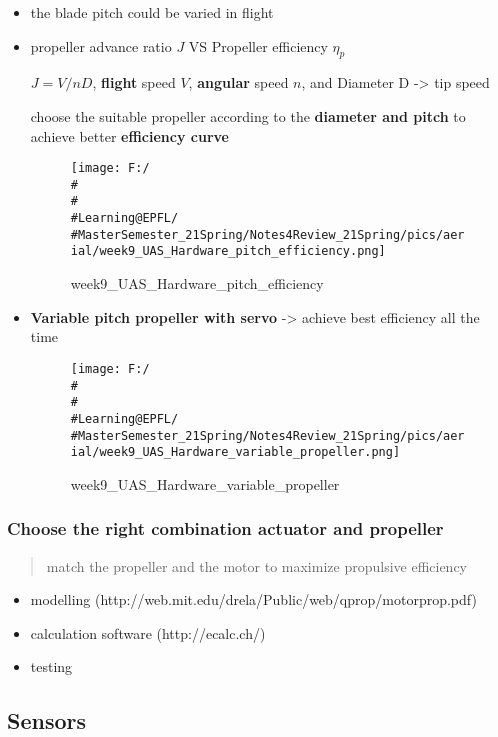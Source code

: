 \documentclass[]{article}
\begin{document}
\begin{itemize}
\item
  the blade pitch could be varied in flight 
\item
  propeller advance ratio \(J\) VS Propeller efficiency \(\eta_p\)

  \(J= V/nD\), \textbf{flight} speed \(V\), \textbf{angular} speed
  \(n\), and Diameter D -\textgreater{} tip speed

  choose the suitable propeller according to the \textbf{diameter and
  pitch} to achieve better \textbf{efficiency curve}

  \begin{figure}
  \centering
  \texttt{[image: F:/\\\#\\\#\\\#Learning@EPFL/\\\#MasterSemester\_21Spring/Notes4Review\_21Spring/pics/aerial/week9\_UAS\_Hardware\_pitch\_efficiency.png]}
  \caption{week9\_UAS\_Hardware\_pitch\_efficiency}
  \end{figure}
\item
  \textbf{Variable pitch propeller with servo} -\textgreater{} achieve
  best efficiency all the time

  \begin{figure}
  \centering
  \texttt{[image: F:/\\\#\\\#\\\#Learning@EPFL/\\\#MasterSemester\_21Spring/Notes4Review\_21Spring/pics/aerial/week9\_UAS\_Hardware\_variable\_propeller.png]}
  \caption{week9\_UAS\_Hardware\_variable\_propeller}
  \end{figure}
\end{itemize}

\subsubsection{Choose the right combination actuator and
propeller}\label{header-n2145}

\begin{quote}
match the propeller and the motor to maximize propulsive efficiency
\end{quote}

\begin{itemize}
\item
  modelling (http://web.mit.edu/drela/Public/web/qprop/motorprop.pdf)
\item
  calculation software (http://ecalc.ch/)
\item
  testing
\end{itemize}

\subsection{Sensors}\label{header-n2155}
\end{document}
